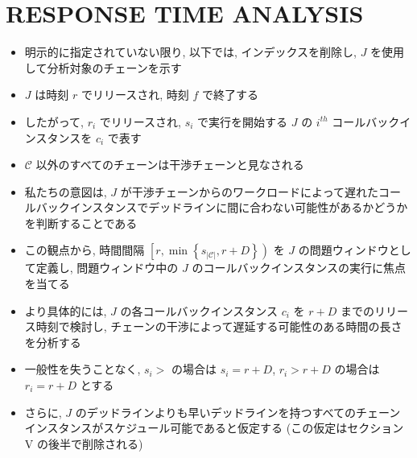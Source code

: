 

\section{RESPONSE TIME ANALYSIS}
\label{sec: responce_time_analysis}


\begin{frame}{}
    \begin{itemize}
        \item 明示的に指定されていない限り, 以下では, インデックスを削除し, $J$ を使用して分析対象のチェーンを示す
        \item $J$ は時刻 $r$ でリリースされ, 時刻 $f$ で終了する
        \item したがって, $r_{i}$ でリリースされ, $s_{i}$ で実行を開始する $J$ の $i^{t h}$ コールバックインスタンスを $c_{i}$ で表す
        \item $\mathcal{C}$ 以外のすべてのチェーンは干渉チェーンと見なされる
    \end{itemize}
\end{frame}

\begin{frame}{}
    \begin{itemize}
        \item 私たちの意図は, $J$ が干渉チェーンからのワークロードによって遅れたコールバックインスタンスでデッドラインに間に合わない可能性があるかどうかを判断することである
        \item この観点から, 時間間隔 $\left[r, \min \left\{s_{|\mathcal{C}|}, r+D\right\}\right)$ を $J$ の問題ウィンドウとして定義し, 問題ウィンドウ中の $J$ のコールバックインスタンスの実行に焦点を当てる
        \item より具体的には, $J$ の各コールバックインスタンス $c_{i}$ を $r+D$ までのリリース時刻で検討し, チェーンの干渉によって遅延する可能性のある時間の長さを分析する
    \end{itemize}
\end{frame}

\begin{frame}{}
    \begin{itemize}
        \item 一般性を失うことなく, $s_{i}>$ の場合は $s_{i}=r+D$, $r_{i}>r+D$ の場合は $r_{i}=r+D$ とする
        \item さらに,  $J$ のデッドラインよりも早いデッドラインを持つすべてのチェーンインスタンスがスケジュール可能であると仮定する (この仮定はセクション V の後半で削除される)
    \end{itemize}
\end{frame}

